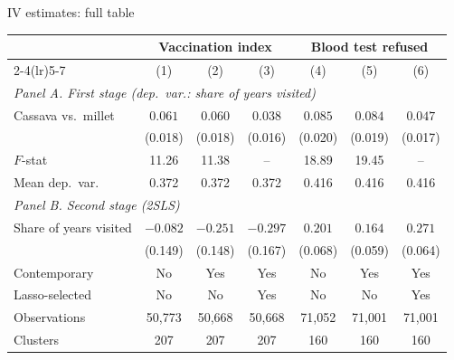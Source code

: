 \documentclass[aspectratio=1610]{beamer}
\newcommand{\returnbutton}[1]{\par\vfill\hfill\hyperlink{#1}{\beamerreturnbutton{Back}}}
\begin{document}
\begin{frame}[label=bk-iv]{IV estimates: full table}
  \centering
  \footnotesize
  \begin{tabular}{lcccccc}
    \toprule
    & \multicolumn{3}{c}{Vaccination index} & \multicolumn{3}{c}{Blood test refused} \\
    \cmidrule(lr){2-4}\cmidrule(lr){5-7}
    & (1) & (2) & (3) & (4) & (5) & (6) \\
    \midrule
    \multicolumn{7}{l}{\emph{Panel A. First stage (dep.\ var.: share of years visited)}} \\
    Cassava vs.\ millet & $0.061$ & $0.060$ & $0.038$ & $0.085$ & $0.084$ & $0.047$ \\
                        & (0.018) & (0.018) & (0.016) & (0.020) & (0.019) & (0.017) \\
    $F$-stat            & 11.26 & 11.38 & -- & 18.89 & 19.45 & -- \\
    Mean dep.\ var.     & 0.372 & 0.372 & 0.372 & 0.416 & 0.416 & 0.416 \\
    \midrule
    \multicolumn{7}{l}{\emph{Panel B. Second stage (2SLS)}} \\
    Share of years visited & $-0.082$ & $-0.251$ & $-0.297$ & $0.201$ & $0.164$ & $0.271$ \\
                           & (0.149)  & (0.148)  & (0.167)  & (0.068) & (0.059) & (0.064) \\
    \midrule
    Contemporary   & No & Yes & Yes & No & Yes & Yes \\
    Lasso-selected & No & No  & Yes & No & No  & Yes \\
    Observations & 50,773 & 50,668 & 50,668 & 71,052 & 71,001 & 71,001 \\
    Clusters     & 207 & 207 & 207 & 160 & 160 & 160 \\
    \bottomrule
  \end{tabular}
  \returnbutton{main-iv}
\end{frame}
\end{document}
